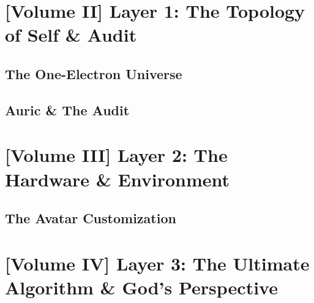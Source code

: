 \documentclass[11pt,a4paper,twoside]{book}
\begin{document}
\part{[Volume II] Layer 1: The Topology of Self \& Audit}

\chapter{The One-Electron Universe}





\chapter{Auric \& The Audit}





\part{[Volume III] Layer 2: The Hardware \& Environment}

\chapter{The Avatar Customization}




\part{[Volume IV] Layer 3: The Ultimate Algorithm \& God's Perspective}
\end{document}

